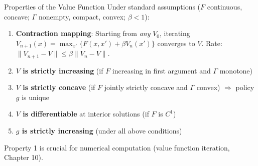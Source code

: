 \documentclass[blue]{beamer}
\begin{document}
\begin{frame}{Properties of the Value Function}
	Under standard assumptions ($F$ continuous, concave; $\Gamma$ nonempty, compact, convex; $\beta < 1$):
	
	\begin{enumerate}
		\item \textbf{Contraction mapping}: Starting from \emph{any} $V_0$, iterating $V_{n+1}(x) = \max_{x'}\{F(x,x') + \beta V_n(x')\}$ converges to $V$. Rate: $\|V_{n+1} - V\| \leq \beta\|V_n - V\|$.
		
		\item \textbf{$V$ is strictly increasing} (if $F$ increasing in first argument and $\Gamma$ monotone)
		
		\item \textbf{$V$ is strictly concave} (if $F$ jointly strictly concave and $\Gamma$ convex) $\Rightarrow$ policy $g$ is unique
		
		\item \textbf{$V$ is differentiable} at interior solutions (if $F$ is $C^1$)
		
		\item \textbf{$g$ is strictly increasing} (under all above conditions)
	\end{enumerate}
	
	\bigskip
	Property 1 is crucial for numerical computation (value function iteration, Chapter 10).
\end{frame}
\end{document}

